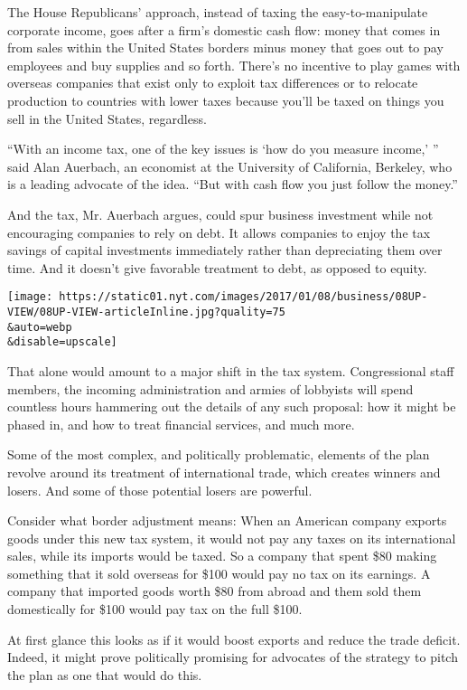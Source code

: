 The House Republicans' approach, instead of taxing the
easy-to-manipulate corporate income, goes after a firm's domestic cash
flow: money that comes in from sales within the United States borders
minus money that goes out to pay employees and buy supplies and so
forth. There's no incentive to play games with overseas companies that
exist only to exploit tax differences or to relocate production to
countries with lower taxes because you'll be taxed on things you sell in
the United States, regardless.

``With an income tax, one of the key issues is `how do you measure
income,' '' said Alan Auerbach, an economist at the University of
California, Berkeley, who is a leading advocate of the idea. ``But with
cash flow you just follow the money.''

And the tax, Mr. Auerbach argues, could spur business investment while
not encouraging companies to rely on debt. It allows companies to enjoy
the tax savings of capital investments immediately rather than
depreciating them over time. And it doesn't give favorable treatment to
debt, as opposed to equity.

\texttt{[image: https://static01.nyt.com/images/2017/01/08/business/08UP-VIEW/08UP-VIEW-articleInline.jpg?quality=75\\\&auto=webp\\\&disable=upscale]}

That alone would amount to a major shift in the tax system.
Congressional staff members, the incoming administration and armies of
lobbyists will spend countless hours hammering out the details of any
such proposal: how it might be phased in, and how to treat financial
services, and much more.

Some of the most complex, and politically problematic, elements of the
plan revolve around its treatment of international trade, which creates
winners and losers. And some of those potential losers are powerful.

Consider what border adjustment means: When an American company exports
goods under this new tax system, it would not pay any taxes on its
international sales, while its imports would be taxed. So a company that
spent \$80 making something that it sold overseas for \$100 would pay no
tax on its earnings. A company that imported goods worth \$80 from
abroad and them sold them domestically for \$100 would pay tax on the
full \$100.

At first glance this looks as if it would boost exports and reduce the
trade deficit. Indeed, it might prove politically promising for
advocates of the strategy to pitch the plan as one that would do this.

